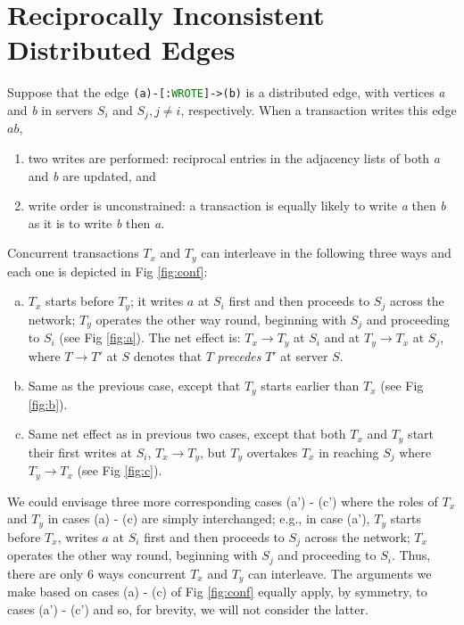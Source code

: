 \section{Reciprocally Inconsistent Distributed Edges}
\label{sec:db-corruption}

Suppose that the edge \texttt{(a)-[:\textcolor{green}{WROTE}]->(b)} is a distributed edge, with vertices \emph{a} and \emph{b} in servers $S_i$ and $S_j , j\neq i$,  respectively.
When a transaction writes this edge $ab$,
\begin{enumerate}
\item two writes are performed: reciprocal entries in the adjacency lists of both \emph{a} and \emph{b} are updated, and
\item write order is unconstrained: a transaction is equally likely to write \emph{a} then \emph{b} as it is to write \emph{b} then \emph{a}.
\end{enumerate}

Concurrent transactions $T_x$ and $T_y$ can interleave in the following three ways and each one is depicted in Fig \ref{fig:conf}:
\begin{enumerate}[(a)]
\item $T_x$ starts before $T_y$; it writes $a$ at $S_i$ first and then proceeds to $S_j$ across the network; $T_y$ operates the other way round, beginning with $S_j$ and proceeding to $S_i$ (see Fig \ref{fig:a}). The net effect is:  $T_x \rightarrow T_y$ at $S_i$ and at  $T_y \rightarrow T_x$ at $S_j$, where  $T \rightarrow T'$ at $S$ denotes that $T$ \emph{precedes} $T'$ at server $S$.
\item Same as the previous case, except that $T_y$ starts earlier than $T_x$ (see Fig \ref{fig:b}).
\item Same net effect as in previous two cases, except that both $T_x$ and $T_y$ start their first writes at $S_i$, $T_x \rightarrow T_y$, but $T_y$ overtakes $T_x$ in reaching $S_j$ where $T_y \rightarrow T_x$ (see Fig \ref{fig:c}).
\end{enumerate}

We could envisage three more corresponding cases (a') - (c') where the roles of $T_x$ and $T_y$ in cases (a) - (c) are simply interchanged; e.g., in case (a'), $T_y$ starts before $T_x$, writes $a$ at $S_i$ first and then proceeds to $S_j$ across the network; $T_x$ operates the other way round, beginning with $S_j$ and proceeding to $S_i$. Thus, there are only 6 ways concurrent $T_x$ and $T_y$ can interleave. The arguments we make based on cases (a) - (c) of Fig \ref{fig:conf} equally apply, by symmetry, to cases (a') - (c') and so, for brevity, we will not consider the latter.

